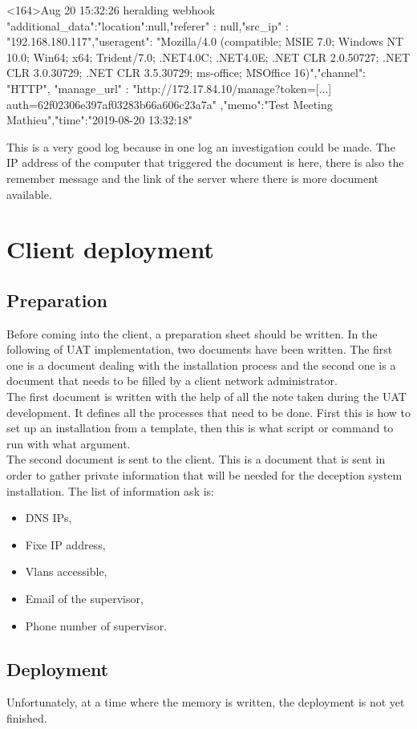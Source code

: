 \documentclass{tnreport}
\begin{document}
<164>Aug 20 15:32:26 heralding webhook {"additional\_data":{"location":null,"referer" : null,"src\_ip" : "192.168.180.117","useragent": "Mozilla/4.0 (compatible; MSIE 7.0; Windows NT 10.0; Win64; x64; Trident/7.0; .NET4.0C; .NET4.0E; .NET CLR 2.0.50727; .NET CLR 3.0.30729; .NET CLR 3.5.30729; ms-office; MSOffice 16)"},"channel": "HTTP", "manage\_url" : "http://172.17.84.10/manage?token=[...] auth=62f02306e397af03283b66a606c23a7a" ,"memo":"Test Meeting Mathieu","time":"2019-08-20 13:32:18"}

This is a very good log because in one log an investigation could be made. The IP address of the computer that triggered the document is here, there is also the remember message and the link of the server where there is more document available. 
 

\cleardoublepage
\chapter{Client deployment}
\section{Preparation}
Before coming into the client, a preparation sheet should be written. In the following of UAT implementation, two documents have been written. The first one is a document dealing with the installation process and the second one is a document that needs to be filled by a client network administrator.\\
The first document is written with the help of all the note taken during the UAT development. It defines all the processes that need to be done. First this is how to set up an installation from a template, then this is what script or command to run with what argument.\\
The second document is sent to the client. This is a document that is sent in order to gather private information that will be needed for the deception system installation. The list of information ask is: 
\begin{itemize}
    \item DNS IPs,
    \item Fixe IP address,  
    \item Vlans accessible,
    \item Email of the supervisor,
    \item Phone number of supervisor.
\end{itemize}


\section{Deployment}
Unfortunately, at a time where the memory is written, the deployment is not yet finished.
\end{document}
